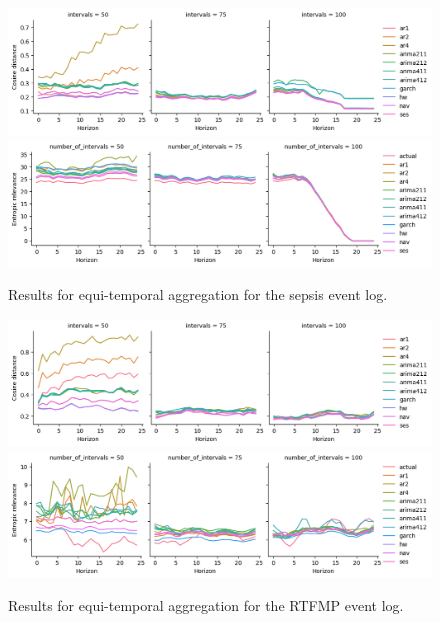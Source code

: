 \begin{figure}
    \centering
    \includegraphics[width=\textwidth]{img/sepsis_cosine_equitemp.png}
    \includegraphics[width=\textwidth]{img/sepsis_entropic_equitemp.png}
    \caption{Results for equi-temporal aggregation for the sepsis event log.}
    \label{fig:sepsis_equitemp}
\end{figure}

\begin{figure}
    \centering
    \includegraphics[width=\textwidth]{img/rtfmp_cosine_equitemp.png}
    \includegraphics[width=\textwidth]{img/rtfmp_entropic_equitemp.png}
    \caption{Results for equi-temporal aggregation for the RTFMP event log.}
    \label{fig:rtfmp_equitemp}
\end{figure}


